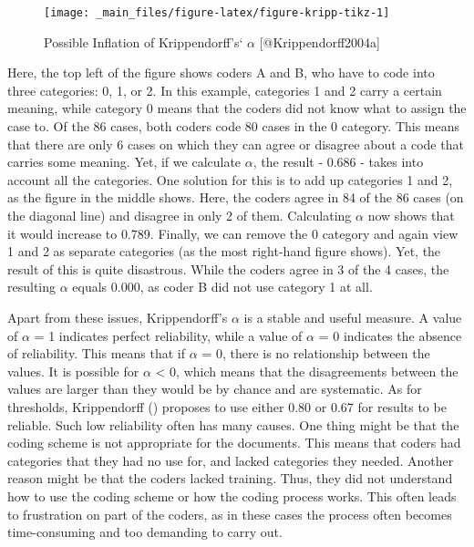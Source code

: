 \documentclass[
]{book}
\begin{document}
\hfill\break

\begin{figure}
\texttt{[image: \_main\_files/figure-latex/figure-kripp-tikz-1]} \caption{Possible Inflation of Krippendorff's` $\alpha$ [@Krippendorff2004a]}\label{fig:figure-kripp-tikz}
\end{figure}

\hfill\break

Here, the top left of the figure shows coders A and B, who have to code into three categories: 0, 1, or 2. In this example, categories 1 and 2 carry a certain meaning, while category 0 means that the coders did not know what to assign the case to. Of the 86 cases, both coders code 80 cases in the 0 category. This means that there are only 6 cases on which they can agree or disagree about a code that carries some meaning. Yet, if we calculate \(\alpha\), the result - 0.686 - takes into account all the categories. One solution for this is to add up categories 1 and 2, as the figure in the middle shows. Here, the coders agree in 84 of the 86 cases (on the diagonal line) and disagree in only 2 of them. Calculating \(\alpha\) now shows that it would increase to 0.789. Finally, we can remove the 0 category and again view 1 and 2 as separate categories (as the most right-hand figure shows). Yet, the result of this is quite disastrous. While the coders agree in 3 of the 4 cases, the resulting \(\alpha\) equals 0.000, as coder B did not use category 1 at all.

Apart from these issues, Krippendorff's \(\alpha\) is a stable and useful measure. A value of \(\alpha\) = 1 indicates perfect reliability, while a value of \(\alpha\) = 0 indicates the absence of reliability. This means that if \(\alpha\) = 0, there is no relationship between the values. It is possible for \(\alpha\) \textless{} 0, which means that the disagreements between the values are larger than they would be by chance and are systematic. As for thresholds, Krippendorff () proposes to use either 0.80 or 0.67 for results to be reliable. Such low reliability often has many causes. One thing might be that the coding scheme is not appropriate for the documents. This means that coders had categories that they had no use for, and lacked categories they needed. Another reason might be that the coders lacked training. Thus, they did not understand how to use the coding scheme or how the coding process works. This often leads to frustration on part of the coders, as in these cases the process often becomes time-consuming and too demanding to carry out.
\end{document}
